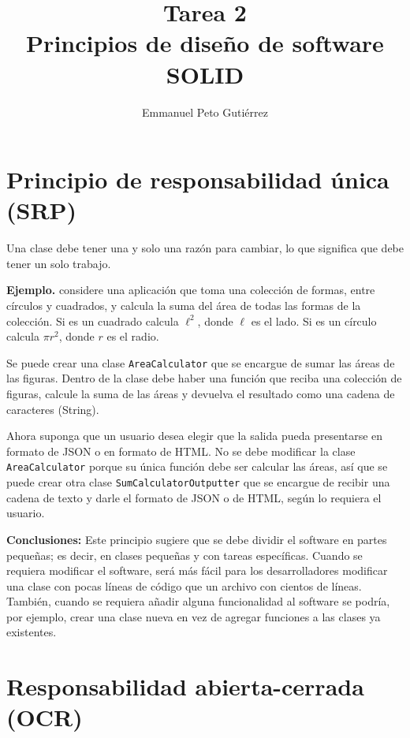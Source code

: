 \documentclass{article}
\title{Tarea 2\\Principios de diseño de software SOLID}
\author{Emmanuel Peto Gutiérrez}
\begin{document}
\maketitle


\section{Principio de responsabilidad única (SRP)}

Una clase debe tener una y solo una razón para cambiar, lo que significa que debe tener un solo trabajo.

\textbf{Ejemplo.} considere una aplicación que toma una colección de formas, entre círculos y cuadrados, y calcula la suma del área de todas las formas de la colección. Si es un cuadrado calcula $\ell^2$, donde $\ell$ es el lado. Si es un círculo calcula $\pi r^2$, donde $r$ es el radio.

Se puede crear una clase \texttt{AreaCalculator} que se encargue de sumar las áreas de las figuras. Dentro de la clase debe haber una función que reciba una colección de figuras, calcule la suma de las áreas y devuelva el resultado como una cadena de caracteres (String).

Ahora suponga que un usuario desea elegir que la salida pueda presentarse en formato de JSON o en formato de HTML. No se debe modificar la clase \texttt{AreaCalculator} porque su única función debe ser calcular las áreas, así que se puede crear otra clase \texttt{SumCalculatorOutputter} que se encargue de recibir una cadena de texto y darle el formato de JSON o de HTML, según lo requiera el usuario.

\textbf{Conclusiones:} Este principio sugiere que se debe dividir el software en partes pequeñas; es decir, en clases pequeñas y con tareas específicas. Cuando se requiera modificar el software, será más fácil para los desarrolladores modificar una clase con pocas líneas de código que un archivo con cientos de líneas. También, cuando se requiera añadir alguna funcionalidad al software se podría, por ejemplo, crear una clase nueva en vez de agregar funciones a las clases ya existentes.

\section{Responsabilidad abierta-cerrada (OCR)}
\end{document}
